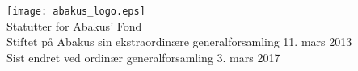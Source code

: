 \documentclass{article}
\begin{document}
\begin{center}
  \texttt{[image: abakus\_logo.eps]} \\
  \Large{Statutter for Abakus' Fond} \\
  \vspace{0.4cm}
  \normalsize{Stiftet på Abakus sin ekstraordinære generalforsamling 11. mars 2013 \\
              Sist endret ved ordinær generalforsamling 3. mars 2017}
\end{center}

\newpage
\tableofcontents
\newpage


\end{document}
